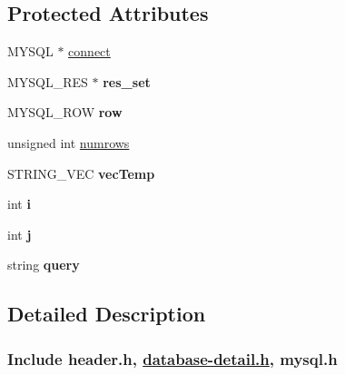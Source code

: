 \subsection*{Protected Attributes}
\begin{DoxyCompactItemize}
\item 
M\-Y\-S\-Q\-L $\ast$ \hyperlink{classDatabase_aa232b806b05ef654cd5579bca5f1dbad}{connect}
\item 
\hypertarget{classDatabase_ad5921cd2f70d0c22895f2cc5542ab4d7}{M\-Y\-S\-Q\-L\-\_\-\-R\-E\-S $\ast$ {\bfseries res\-\_\-set}}\label{classDatabase_ad5921cd2f70d0c22895f2cc5542ab4d7}

\item 
\hypertarget{classDatabase_a71ad7ae59677936d2ca6666f9de9df40}{M\-Y\-S\-Q\-L\-\_\-\-R\-O\-W {\bfseries row}}\label{classDatabase_a71ad7ae59677936d2ca6666f9de9df40}

\item 
unsigned int \hyperlink{classDatabase_a02965883689dd1d8007c86cebf6df89e}{numrows}
\item 
\hypertarget{classDatabase_a88f3a0df87e5e40207100d5b1f7ee6b1}{S\-T\-R\-I\-N\-G\-\_\-\-V\-E\-C {\bfseries vec\-Temp}}\label{classDatabase_a88f3a0df87e5e40207100d5b1f7ee6b1}

\item 
\hypertarget{classDatabase_a1b3174ab4ae9b3cb80448d48817375be}{int {\bfseries i}}\label{classDatabase_a1b3174ab4ae9b3cb80448d48817375be}

\item 
\hypertarget{classDatabase_a5b4fd605238ca66878959f5f3ba647f2}{int {\bfseries j}}\label{classDatabase_a5b4fd605238ca66878959f5f3ba647f2}

\item 
\hypertarget{classDatabase_a851daa5b233ce54d75873631b7b2167a}{string {\bfseries query}}\label{classDatabase_a851daa5b233ce54d75873631b7b2167a}

\end{DoxyCompactItemize}


\subsection{Detailed Description}


 \subsubsection*{Include header.\-h, \hyperlink{database-detail_8h_source}{database-\/detail.\-h}, mysql.\-h}



